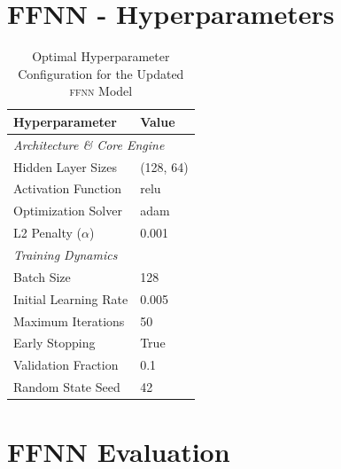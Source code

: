\documentclass[manuscript,screen,review, nonacm]{acmart}
\begin{document}
\section{FFNN - Hyperparameters}
\label{app:ffnn_hyperparameters}
\begin{table}[H]
\centering
\caption{Optimal Hyperparameter Configuration for the Updated \textsc{ffnn} Model}
\label{tab:ffnn_hyperparameters}
\small
\begin{tabular}{ll}
\toprule
\textbf{Hyperparameter} & \textbf{Value} \\
\midrule
\multicolumn{2}{l}{\textit{Architecture \& Core Engine}} \\
Hidden Layer Sizes & (128, 64) \\
Activation Function & relu \\
Optimization Solver & adam \\
L2 Penalty ($\alpha$) & 0.001 \\
\midrule
\multicolumn{2}{l}{\textit{Training Dynamics}} \\
Batch Size & 128 \\
Initial Learning Rate & 0.005 \\
Maximum Iterations & 50 \\
Early Stopping & True \\
Validation Fraction & 0.1 \\
Random State Seed & 42 \\
\bottomrule
\end{tabular}
\end{table}

\section{FFNN Evaluation}
\label{app:ffnn_evaluation}
\end{document}
